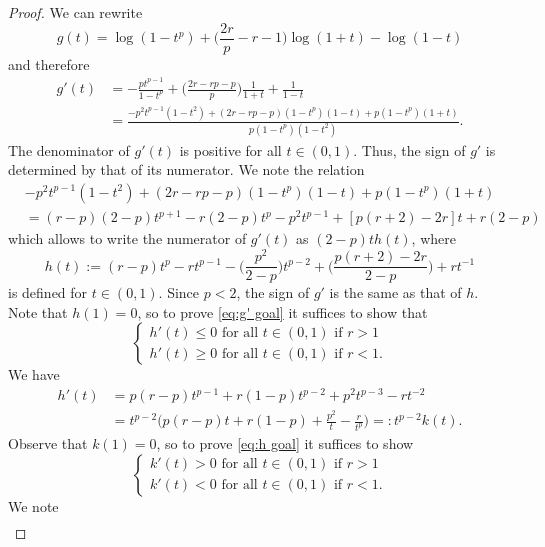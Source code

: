 \documentclass[reqno, 10pt]{amsart}
\theoremstyle{plain}
\numberwithin{equation}{section}
\theoremstyle{definition}
\newtheorem*{induction hypothesis}{Induction hypothesis}
\theoremstyle{remark}
\begin{document}
\begin{proof}
We can rewrite
    \[g(t) = \log(1-t^p ) + \Big( \frac{2r}{p} - r - 1\Big) \log(1+t) - \log(1-t)\]
and therefore
    \begin{align*}
        g'(t) &= -\frac{p t^{p-1}}{1-t^p} + \Big( \frac{2r - rp - p}{p} \Big)  \frac{1}{1+t}  + \frac{1}{1-t} \\
        &= \frac{-p^2 t^{p-1} (1-t^2) + (2r-rp-p)(1-t^p)(1-t) + p(1-t^p)(1+t)}{p(1-t^p)(1-t^2)}.
    \end{align*}
    The denominator of $g'(t)$ is positive for all $t \in (0,1)$. Thus, the sign of $g'$ is determined by that of its numerator. We note the relation 
    \begin{align*}
        & -p^2 t^{p-1} (1-t^2) + (2r-rp-p)(1-t^p)(1-t) + p(1-t^p)(1+t) \\
        &= (r-p)(2-p) t^{p+1} - r(2-p)  t^p - p^2  t^{p-1} + [p(r+2) - 2r]  t + r(2-p)
    \end{align*}
    which allows to write the numerator of $g'(t)$ as $(2-p)t h(t)$, where
    \[h(t) := (r-p) t^{p} - r t^{p-1} - \Big( \frac{p^2}{2-p} \Big)  t^{p-2} + \Big( \frac{p(r+2) - 2r}{2-p} \Big)   + rt^{-1}\]
    is defined for $t \in (0,1)$. Since $p <2$, the sign of $g'$ is the same as that of $h$. Note that $h(1) = 0$, so to prove \eqref{eq:g' goal} it suffices to show that 
    \begin{equation}\label{eq:h goal}
    \begin{cases}
        h'(t) \leq 0 \text{ for all } t \in (0,1) \text{ if $r >1$} \\
        h'(t) \geq 0 \text{ for all } t \in (0,1) \text{ if $r <1$}.
    \end{cases}
\end{equation}
    We have 
    \begin{align*}
        h'(t) &= p(r-p)  t^{p-1} + r(1-p)  t^{p-2} + p^2  t^{p-3} - r t^{-2} \\
        &= t^{p-2}\Big( p(r-p)  t + r(1-p) + \frac{p^2}{t} - \frac{r}{t^p} \Big) = : t^{p-2}k(t).
    \end{align*}
Observe that $k(1) = 0$, so to prove \eqref{eq:h goal} it suffices to show
\begin{equation}\label{eq:k' goal}
    \begin{cases}
        k'(t) > 0 \text{ for all } t \in (0,1) \text{ if $r >1$} \\
        k'(t) < 0 \text{ for all } t \in (0,1) \text{ if $r <1$}.
    \end{cases}
\end{equation}
We note
\begin{align*}

\end{align*}
\end{proof}
\end{document}
